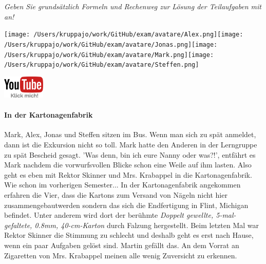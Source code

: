 \documentclass[a4paper, 9pt]{scrartcl}\usepackage[]{graphicx}\usepackage[]{xcolor}
\begin{document}
\textit{Geben Sie grundsätzlich Formeln und Rechenweg zur Lösung der Teilaufgaben mit an!} \\[1Ex]
 

 
\ifcollection
\begin{flushright}
\tiny\vspace{-3Ex}
\textbf{\examinhaltstart}
\exammodulemathstat
\vspace{-4Ex}
\end{flushright}
\begin{minipage}[t]{0.5\textwidth}
\texttt{[image: /Users/kruppajo/work/GitHub/exam/avatare/Alex.png]}\hspace{-4mm}\texttt{[image: /Users/kruppajo/work/GitHub/exam/avatare/Jonas.png]}\hspace{-4mm}\texttt{[image: /Users/kruppajo/work/GitHub/exam/avatare/Mark.png]}\hspace{-4mm}\texttt{[image: /Users/kruppajo/work/GitHub/exam/avatare/Steffen.png]}
\end{minipage}
\begin{minipage}[t]{0.5\textwidth}
\hfill
\href{https://youtu.be/RuzMjwvwT-4}{\includegraphics[width = 2cm]{img/youtube}}
\end{minipage}
\fi



\ifcollection
\paragraph{In der Kartonagenfabrik}
\fi



Mark, Alex, Jonas und Steffen sitzen im Bus. Wenn man sich zu spät anmeldet, dann ist die Exkursion nicht so toll. Mark hatte den Anderen in der Lerngruppe zu spät Bescheid gesagt. 'Was denn, bin ich eure Nanny oder was?!', entfährt es Mark nachdem die vorwurfsvollen Blicke schon eine Weile auf ihm lasten. Also geht es eben mit Rektor Skinner und Mrs. Krabappel in die Kartonagenfabrik. Wie schon im vorherigen Semester... In der Kartonagenfabrik angekommen erfahren die Vier, dass die Kartons zum Versand von Nägeln nicht hier zusammengebautwerden sondern das sich die Endfertigung in Flint, Michigan befindet. Unter anderem wird dort der berühmte \textit{Doppelt gewellte, 5-mal-gefaltete, 0.8mm, 40-cm-Karton} durch
Falzung hergestellt. Beim letzten Mal war Rektor Skinner die Stimmung zu schlecht und deshalb geht es erst nach Hause, wenn ein paar Aufgaben gelöst sind. Martin gefällt das. An dem Vorrat an Zigaretten von Mrs. Krabappel meinen alle wenig Zuversicht zu erkennen.\\
\end{document}
